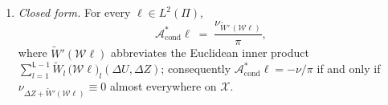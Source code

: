 \begin{lemma}
\begin{enumerate}
%
\item[(iii)] \emph{Closed form.} For every $\ell\in L^{2}(\Pi)$,
\begin{equation}\label{eq:adjclosed}
\mathcal A^\ast_{\mathrm{cond}}\ell\;=\;\frac{\nu_{\widetilde W'\,(\mathcal W\ell)}}{\pi} ,
\end{equation}
where $\widetilde W'(\mathcal W\ell)$ abbreviates the Euclidean inner product
$\sum_{l=1}^{\mathsf L-1}\widetilde W_l\,\big(\mathcal W\ell\big)_l(\Delta U,\Delta Z)$;
consequently $\mathcal A^\ast_{\mathrm{cond}}\ell=-\nu/\pi$ if and only if
$\nu_{\Delta Z+\widetilde W'(\mathcal W\ell)}\equiv0$ almost everywhere on $\mathcal X$.
\end{enumerate}
\end{lemma}

